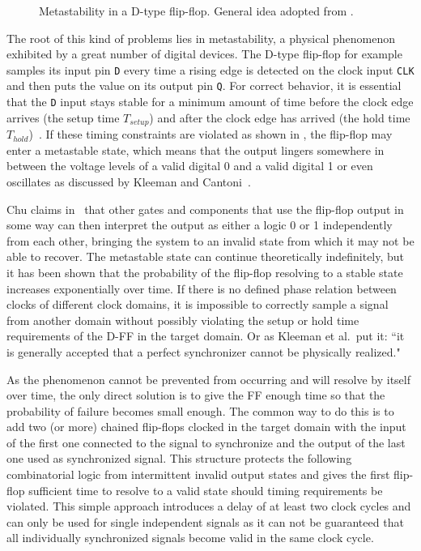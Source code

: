 \documentclass[a4paper, 11pt, oneside]{Thesis}  %
\begin{document}
\begin{figure}
\centering

\caption[Metastability in a D-type flip-flop]{Metastability in a D-type flip-flop. General idea adopted from \cite[fig. 16.8]{RTLHardwareDesign}.}
\label{fig:metastability}
\end{figure}

The root of this kind of problems lies in metastability, a physical phenomenon exhibited by a great number of digital devices. The D-type flip-flop for example samples its input pin \texttt{D} every time a rising edge is detected on the clock input \texttt{CLK} and then puts the value on its output pin \texttt{Q}. For correct behavior, it is essential that the \texttt{D} input stays stable for a minimum amount of time before the clock edge arrives (the setup time $T_{setup}$) and after the clock edge has arrived (the hold time $T_{hold}$)~\cite{RTLHardwareDesign}. If these timing constraints are violated as shown in , the flip-flop may enter a metastable state, which means that the output lingers somewhere in between the voltage levels of a valid digital 0 and a valid digital 1 or even oscillates as discussed by Kleeman and Cantoni~\cite{IEEEMetastability}.

Chu claims in~\cite{RTLHardwareDesign} that other gates and components that use the flip-flop output in some way can then interpret the output as either a logic 0 or 1 independently from each other, bringing the system to an invalid state from which it may not be able to recover. The metastable state can continue theoretically indefinitely, but it has been shown that the probability of the flip-flop resolving to a stable state increases exponentially over time. If there is no defined phase relation between clocks of different clock domains, it is impossible to correctly sample a signal from another domain without possibly violating the setup or hold time requirements of the D-FF in the target domain. Or as Kleeman et al.\ put it: ``it is generally accepted that a perfect synchronizer cannot be physically realized."~\cite{IEEEMetastability}

As the phenomenon cannot be prevented from occurring and will resolve by itself over time, the only direct solution is to give the FF enough time so that the probability of failure becomes small enough. The common way to do this is to add two (or more) chained flip-flops clocked in the target domain with the input of the first one connected to the signal to synchronize and the output of the last one used as synchronized signal. This structure protects the following combinatorial logic from intermittent invalid output states and gives the first flip-flop sufficient time to resolve to a valid state should timing requirements be violated. This simple approach introduces a delay of at least two clock cycles and can only be used for single independent signals as it can not be guaranteed that all individually synchronized signals become valid in the same clock cycle.
\end{document}
